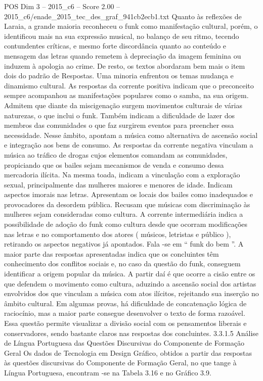 \begin{textsample}{POS Dim 3 – 2015\_c6 – Score 2.00 – 2015\_c6/enade\_2015\_tec\_des\_graf\_941cb2ecb1.txt}
Quanto às reflexões de Laraia, a grande maioria reconheceu o funk como manifestação cultural, porém, o identificou mais na sua expressão musical, no balanço de seu ritmo, tecendo contundentes críticas, e mesmo forte discordância quanto ao conteúdo e mensagem das letras quando remetem à depreciação da imagem feminina ou induzem à apologia ao crime.
De resto, os textos abordaram bem mais o item dois do padrão de Respostas.
Uma minoria enfrentou os temas mudança e dinamismo cultural.
As respostas da corrente positiva indicam que o preconceito sempre acompanhou as manifestações populares como o samba, na sua origem.
Admitem que diante da miscigenação surgem movimentos culturais de várias naturezas, o que inclui o funk.
Também indicam a dificuldade de lazer dos membros das comunidades o que faz surgirem eventos para preencher essa necessidade.
Nesse âmbito, apontam a música como alternativa de ascensão social e integração aos bens de consumo.
As respostas da corrente negativa vinculam a música ao tráfico de drogas cujos elementos comandam as comunidades, propiciando que os bailes sejam mecanismos de venda e consumo dessa mercadoria ilícita.
Na mesma toada, indicam a vinculação com a exploração sexual, principalmente das mulheres maiores e menores de idade.
Indicam aspectos imorais nas letras.
Apresentam os locais dos bailes como inadequados e provocadores da desordem pública.
Recusam que músicas com discriminação às mulheres sejam consideradas como cultura.
A corrente intermediária indica a possibilidade de adoção do funk como cultura desde que ocorram modificações nas letras e no comportamento dos atores ( músicos, letristas e público ), retirando os aspectos negativos já apontados.
Fala -se em “ funk do bem ”.
A maior parte das respostas apresentadas indica que os concluintes têm conhecimento dos conflitos sociais e, no caso da questão do funk, conseguem identificar a origem popular da música.
A partir daí é que ocorre a cisão entre os que defendem o movimento como cultura, aduzindo a ascensão social dos artistas envolvidos dos que vinculam a música com atos ilícitos, rejeitando sua inserção no âmbito cultural.
Em algumas provas, há dificuldade de concatenação lógica de raciocínio, mas a maior parte consegue desenvolver o texto de forma razoável.
Essa questão permite visualizar a divisão social com os pensamentos liberais e conservadores, sendo bastante claros nas respostas dos concluintes. 3.3.1.5 Análise de Língua Portuguesa das Questões Discursivas do Componente de Formação Geral Os dados de Tecnologia em Design Gráfico, obtidos a partir das respostas às questões discursivas do Componente de Formação Geral, no que tange à Língua Portuguesa, encontram -se na Tabela 3.16 e no Gráfico 3.9.

\end{textsample}
